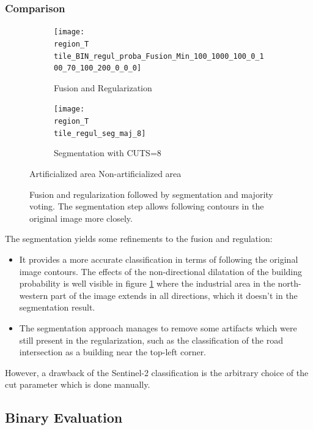 \documentclass[10pt]{article}
\newcommand{\legendebin}{\vspace{3mm}
    
    \small\centering
    \fcolorbox{black}{red}{\rule{0pt}{6pt}\rule{6pt}{0pt}}\quad Artificialized area 
    \fcolorbox{black}{green}{\rule{0pt}{6pt}\rule{6pt}{0pt}}\quad Non-artificialized area
    }
\newcommand{\tile}{41000_30000}
\newcommand{\region}{finistere}
\begin{document}
\subsubsection{Comparison}
\newcommand{\figureBinRegulSeg}{
\begin{figure}[H]
    \centering
    \begin{subfigure}{0.49\textwidth}
        \centering
        \texttt{[image: \\region\_T\\tile\_BIN\_regul\_proba\_Fusion\_Min\_100\_1000\_100\_0\_100\_70\_100\_200\_0\_0\_0]}
        \caption{Fusion and Regularization}
        \label{subfig:fusionRegComp\tile}
    \end{subfigure}
    \begin{subfigure}{0.49\textwidth}
        \centering
        \texttt{[image: \\region\_T\\tile\_regul\_seg\_maj\_8]}
        \caption{Segmentation with CUTS=8}
    \end{subfigure}
    \legendebin
    \caption{Fusion and regularization followed by segmentation and majority voting. The segmentation step allows following contours in the original image more closely.}
    \label{fig:comparison\tile}
\end{figure}
}
\figureBinRegulSeg
The segmentation yields some refinements to the fusion and regulation:
\begin{itemize}
    \item It provides a more accurate classification in terms of following the original image contours. The effects of the non-directional dilatation of the building probability is well visible in figure \ref{subfig:fusionRegComp\tile} where the industrial area in the north-western part of the image extends in all directions, which it doesn't in the segmentation result.
    \item The segmentation approach manages to remove some artifacts which were still present in the regularization, such as the classification of the road intersection as a building near the top-left corner.
\end{itemize}
However, a drawback of the Sentinel-2 classification is the arbitrary choice of the cut parameter which is done manually.

\subsection{Binary Evaluation}
\end{document}
